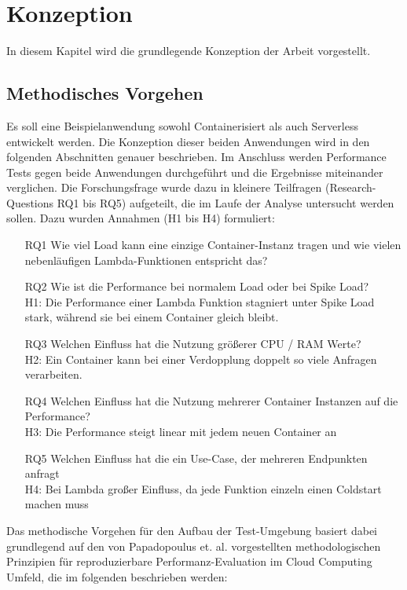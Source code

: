 \chapter{Konzeption}
In diesem Kapitel wird die grundlegende Konzeption der Arbeit vorgestellt.

\section{Methodisches Vorgehen}
Es soll eine Beispielanwendung sowohl Containerisiert als auch Serverless entwickelt werden. Die Konzeption dieser beiden Anwendungen wird in den folgenden Abschnitten genauer beschrieben. 
Im Anschluss werden Performance Tests gegen beide Anwendungen durchgeführt und die Ergebnisse miteinander verglichen. Die Forschungsfrage wurde dazu in kleinere Teilfragen (Research-Questions RQ1 bis RQ5) aufgeteilt, die im Laufe der Analyse untersucht werden sollen. Dazu wurden Annahmen (H1 bis H4) formuliert:

\begin{enumerate}
    \item[RQ1] Wie viel Load kann eine einzige Container-Instanz tragen und wie vielen nebenläufigen Lambda-Funktionen entspricht das?
    
    \item[RQ2] Wie ist die Performance bei normalem Load oder bei Spike Load? \\
    H1: Die Performance einer Lambda Funktion stagniert unter Spike Load stark, während sie bei einem Container gleich bleibt.

    \item[RQ3] Welchen Einfluss hat die Nutzung größerer CPU / RAM Werte? \\
    H2: Ein Container kann bei einer Verdopplung doppelt so viele Anfragen verarbeiten.
    
    \item[RQ4] Welchen Einfluss hat die Nutzung mehrerer Container Instanzen auf die Performance? \\
    H3: Die Performance steigt linear mit jedem neuen Container an
    
    \item[RQ5] Welchen Einfluss hat die ein Use-Case, der mehreren Endpunkten anfragt\\
    H4: Bei Lambda großer Einfluss, da jede Funktion einzeln einen Coldstart machen muss
\end{enumerate}

Das methodische Vorgehen für den Aufbau der Test-Umgebung basiert dabei grundlegend auf den von Papadopoulus et. al. vorgestellten methodologischen Prinzipien für reproduzierbare Performanz-Evaluation im Cloud Computing Umfeld, die im folgenden beschrieben werden\cite{papadopoulos_methodological_2019}:

